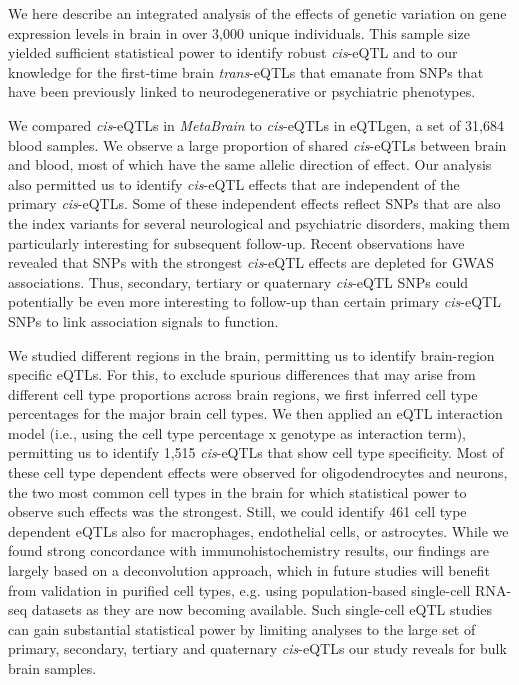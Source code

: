 We here describe an integrated analysis of the effects of genetic variation on gene expression levels in brain in over 3,000 unique individuals. This sample size yielded sufficient statistical power to identify robust \textit{cis}-eQTL and to our knowledge for the first-time brain \textit{trans}-eQTLs that emanate from SNPs that have been previously linked to neurodegenerative or psychiatric phenotypes. 

We compared \textit{cis}-eQTLs in \textit{MetaBrain} to \textit{cis}-eQTLs in eQTLgen, a set of 31,684 blood samples. We observe a large proportion of shared \textit{cis}-eQTLs between brain and blood, most of which have the same allelic direction of effect. Our analysis also permitted us to identify \textit{cis}-eQTL effects that are independent of the primary \textit{cis}-eQTLs. Some of these independent effects reflect SNPs that are also the index variants for several neurological and psychiatric disorders, making them particularly interesting for subsequent follow-up. Recent observations have revealed that SNPs with the strongest \textit{cis}-eQTL effects are depleted for GWAS associations\cite{wangEnhancerDomainsPredict2020}. Thus, secondary, tertiary or quaternary \textit{cis}-eQTL SNPs could potentially be even more interesting to follow-up than certain primary \textit{cis}-eQTL SNPs to link association signals to function.

We studied different regions in the brain, permitting us to identify brain-region specific eQTLs. For this, to exclude spurious differences that may arise from different cell type proportions across brain regions, we first inferred cell type percentages for the major brain cell types. We then applied an eQTL interaction model (i.e., using the cell type percentage x genotype as interaction term), permitting us to identify 1,515 \textit{cis}-eQTLs that show cell type specificity. Most of these cell type dependent effects were observed for oligodendrocytes and neurons, the two most common cell types in the brain for which statistical power to observe such effects was the strongest. Still, we could identify 461 cell type dependent eQTLs also for macrophages, endothelial cells, or astrocytes. While we found strong concordance with immunohistochemistry results, our findings are largely based on a deconvolution approach, which in future studies will benefit from validation in purified cell types, e.g. using population-based single-cell RNA-seq datasets as they are now becoming available\cite{wijstSinglecellRNASequencing2018,PopulationscaleSinglecellRNAseq}. Such single-cell eQTL studies can gain substantial statistical power by limiting analyses to the large set of primary, secondary, tertiary and quaternary \textit{cis}-eQTLs our study reveals for bulk brain samples. 

